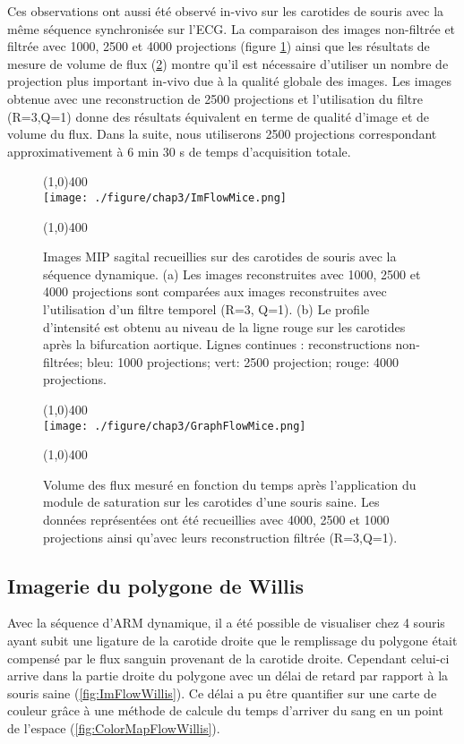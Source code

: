 Ces observations ont aussi été observé in-vivo sur les carotides de souris avec la même séquence synchronisée sur l'ECG. La comparaison des images non-filtrée et filtrée avec 1000, 2500 et 4000 projections (figure \ref{fig:ImFlowMice}) ainsi que les résultats de mesure de volume de flux (\ref{fig:GraphFlowMice}) montre qu'il est nécessaire d'utiliser un nombre de projection plus important in-vivo due à la qualité globale des images. Les images obtenue avec une reconstruction de 2500 projections et l'utilisation du filtre (R=3,Q=1) donne des résultats équivalent en terme de qualité d'image et de volume du flux. Dans la suite, nous utiliserons 2500 projections correspondant approximativement à 6 min 30 s de temps d'acquisition totale.
\begin{figure}[H]
\centering \line(1,0){400} \\
\texttt{[image: ./figure/chap3/ImFlowMice.png]}
\caption[Image ARM dynamique sur souris]{\label{fig:ImFlowMice} Images MIP sagital recueillies sur des carotides de souris avec la séquence dynamique. (a) Les images reconstruites avec 1000, 2500 et 4000 projections sont comparées aux images reconstruites avec l'utilisation d'un filtre temporel (R=3, Q=1). (b) Le profile d'intensité est obtenu au niveau de la ligne rouge sur les carotides après la bifurcation aortique. Lignes continues : reconstructions non-filtrées; bleu: 1000 projections; vert: 2500 projection; rouge: 4000 projections.}
\line(1,0){400} \\ \end{figure}

\begin{figure}[H]
\centering \line(1,0){400} \\
\texttt{[image: ./figure/chap3/GraphFlowMice.png]}
\caption[Graphique de progression du flux sur fantôme]{\label{fig:GraphFlowMice} Volume des flux mesuré en fonction du temps après l'application du module de saturation sur les carotides d'une souris saine. Les données représentées ont été recueillies avec 4000, 2500 et 1000 projections ainsi qu'avec leurs reconstruction filtrée (R=3,Q=1).}
\line(1,0){400} \\ \end{figure}

\subsection{Imagerie du polygone de Willis}

Avec la séquence d'ARM dynamique, il a été possible de visualiser chez 4 souris ayant subit une ligature de la carotide droite que le remplissage du polygone était compensé par le flux sanguin provenant de la carotide droite. Cependant celui-ci arrive dans la partie droite du polygone avec un délai de retard par rapport à la souris saine (\ref{fig:ImFlowWillis}).
Ce délai a pu être quantifier sur une carte de couleur grâce à une méthode de calcule du temps d'arriver du sang en un point de l'espace (\ref{fig:ColorMapFlowWillis}).

